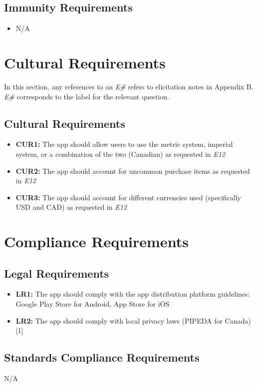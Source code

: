 \documentclass[12pt]{article}
\begin{document}
\subsection{Immunity Requirements}
\begin{itemize}
    \item N/A
\end{itemize}

\section{Cultural Requirements}
In this section, any references to an \textit{E\#} refers to elicitation notes in Appendix B. \textit{E\#} corresponds to the label for the relevant question.
\subsection{Cultural Requirements}
\begin{itemize}
    \item \textbf{CUR1:} The app should allow users to use the metric system, imperial system, or a combination of the two (Canadian) as requested in \textit{E12}
    \item \textbf{CUR2:} The app should account for uncommon purchase items as requested in \textit{E12}
    \item \textbf{CUR3:} The app should account for different currencies used (specifically USD and CAD) as requested in \textit{E12}
\end{itemize}

\section{Compliance Requirements}
\subsection{Legal Requirements}
\begin{itemize}
    \item \textbf{LR1:} The app should comply with the app distribution platform guidelines: Google Play Store for Android, App Store for iOS
    \item \textbf{LR2:} The app should comply with local privacy laws (PIPEDA for Canada) [1]
\end{itemize}
\subsection{Standards Compliance Requirements}
N/A
\end{document}
